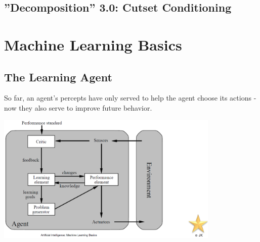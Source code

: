 \documentclass[conference, a4paper]{styles/acmsiggraph}
\begin{document}
    \subsection{''Decomposition'' 3.0:  Cutset Conditioning}
        
    
    
    
    
    

\section{Machine Learning Basics}
    
    \subsection{The Learning Agent}
        So far, an agent's percepts have only served to help the agent choose its actions -now they also serve to improve future behavior.\newline
        
        \includegraphics[width=0.8\textwidth]{imgs/TheLearningAgent.png}\newline
        
\end{document}
